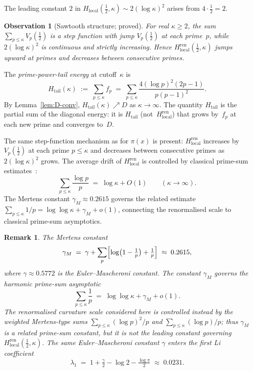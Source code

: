 \documentclass[11pt]{article}
\newtheorem{observation}[theorem]{Observation}
\newtheorem*{remark}{Remark}
\newcommand{\Hlocal}{H_{\mathrm{local}}}
\newcommand{\Hren}{H_{\mathrm{local}}^{\mathrm{ren}}}
\begin{document}
The leading constant $2$ in
$\Hlocal(\tfrac12,\kappa)\sim 2(\log\kappa)^2$
arises from
$4\cdot\tfrac12 = 2$.

\begin{observation}[Sawtooth structure; proved]\label{obs:sawtooth}
For real $\kappa\ge 2$, the sum
$\sum_{p\le\kappa}V_p(\tfrac12)$
is a step function with jump $V_p(\tfrac12)$ at each
prime~$p$, while $2(\log\kappa)^2$ is continuous and strictly
increasing.
Hence $\Hren(\tfrac12,\kappa)$ jumps upward at primes and
decreases between consecutive primes.
\end{observation}

\medskip
The \emph{prime-power-tail energy} at cutoff~$\kappa$ is
\begin{equation}\label{eq:Htail}
H_{\mathrm{tail}}(\kappa)
\;:=\;
\sum_{p\le\kappa} f_p
\;=\;
\sum_{p\le\kappa}
\frac{4(\log p)^2(2p-1)}{p(p-1)^2}.
\end{equation}
By Lemma~\ref{lem:D-conv}, $H_{\mathrm{tail}}(\kappa)\nearrow D$
as $\kappa\to\infty$.
The quantity $H_{\mathrm{tail}}$ is the partial sum of the
diagonal energy: it is $H_{\mathrm{tail}}$ (not~$\Hren$) that
grows by~$f_p$ at each new prime and converges to~$D$.

The same step-function mechanism as for $\pi(x)$ is present:
$\Hren$ increases by~$V_p(\tfrac12)$ at each
prime $p\le\kappa$ and decreases between consecutive primes
as $2(\log\kappa)^2$ grows.
The average drift of $\Hren$ is controlled by classical
prime-sum estimates~\cite{Mertens}:
\[
\sum_{p\le\kappa}\frac{\log p}{p} \;=\; \log\kappa + O(1)
\qquad (\kappa\to\infty).
\]
The Mertens constant
$\gamma_M\approx 0.2615$ governs the related estimate
$\sum_{p\le\kappa}1/p = \log\log\kappa + \gamma_M + o(1)$,
connecting the renormalised scale to classical prime-sum
asymptotics.

\begin{remark}
The Mertens constant
\[
\gamma_M \;=\; \gamma + \sum_p\Bigl[\log\bigl(1-\tfrac1p\bigr)+\tfrac1p\Bigr]
\;\approx\; 0.2615,
\]
where $\gamma\approx 0.5772$ is the Euler--Mascheroni constant.
The constant $\gamma_M$ governs the harmonic prime-sum asymptotic
\[
\sum_{p\le\kappa}\frac{1}{p}
\;=\; \log\log\kappa + \gamma_M + o(1).
\]
The renormalised curvature scale considered here is controlled
instead by the weighted Mertens-type sums
$\sum_{p\le\kappa}(\log p)^2/p$ and
$\sum_{p\le\kappa}(\log p)/p$;
thus $\gamma_M$ is a related prime-sum constant, but it is not
the leading constant governing
$\Hren(\tfrac12,\kappa)$.
The same Euler--Mascheroni constant $\gamma$ enters the first Li
coefficient~\cite{Li}
\[
\lambda_1 \;=\; 1 + \tfrac{\gamma}{2} - \log 2
- \tfrac{\log\pi}{2} \;\approx\; 0.0231.
\]
\end{remark}
\end{document}
